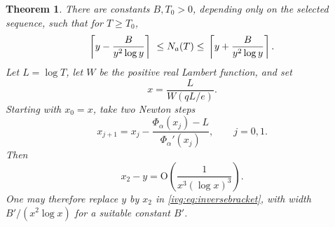 \documentclass[11pt,letterpaper]{article}
\newtheorem{theorem}{Theorem}[section]
\theoremstyle{definition}\newtheorem{definition}[theorem]{Definition}
\theoremstyle{remark}\newtheorem{remark}[theorem]{Remark}
\newcommand{\OO}{\mathrm O}
\newcommand{\ceil}[1]{\left\lceil #1\right\rceil}
\begin{document}
\begin{theorem}\label{ivg:thm:inverse}
There are constants $B,T_0>0$, depending only on the selected sequence, such that for $T\ge T_0$,
\begin{equation}\label{ivg:eq:inversebracket}
 \ceil{y-\frac{B}{y^2\log y}}
 \ \le N_a(T)\le\\
 \ceil{y+\frac{B}{y^2\log y}}.
\end{equation}
Let $L=\log T$, let $W$ be the positive real Lambert function, and set
\begin{equation}\label{ivg:eq:Lambert}
 x=\frac{L}{W(qL/e)}.
\end{equation}
Starting with $x_0=x$, take two Newton steps
\begin{equation}\label{ivg:eq:newton}
 x_{j+1}=x_j-\frac{\Phi_\alpha(x_j)-L}{\Phi_\alpha'(x_j)},\qquad j=0,1.
\end{equation}
Then
\begin{equation}\label{ivg:eq:newtonerror}
 x_2-y=\OO\!\left(\frac1{x^3(\log x)^3}\right).
\end{equation}
One may therefore replace $y$ by $x_2$ in \eqref{ivg:eq:inversebracket}, with width $B'/(x^2\log x)$ for a suitable constant $B'$.
\end{theorem}
\end{document}
